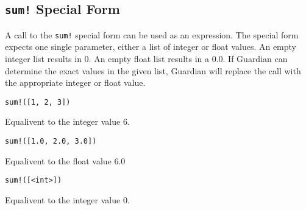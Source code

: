 
\subsection{\texttt{sum!} Special Form}
{
	A call to the \texttt{sum!} special form can be used as an expression.
	The special form expects one single parameter, either a list of integer
	or float values. An empty integer list results in 0. An empty float list
	results in a 0.0.
	If Guardian can determine the exact values in the given list, Guardian
	will replace the call with the appropriate integer or float value.
	
	\begin{itemize}
	{
		\item \texttt{sum!([1, 2, 3])}
		
			Equalivent to the integer value 6.
		
		\item \texttt{sum!([1.0, 2.0, 3.0])}
		
			Equalivent to the float value 6.0
		
		\item \texttt{sum!([<int>])}
		
			Equalivent to the integer value 0.
	}
	\end{itemize}
}
